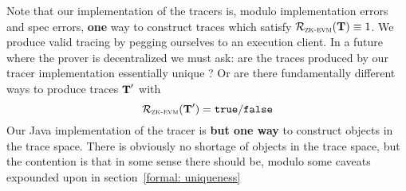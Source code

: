 Note that our implementation of the tracers is, modulo implementation errors and spec errors, \textbf{one} way to construct traces which satisfy $\mathcal{R}_{\textsc{zk-evm}}(\textbf{T}) \equiv 1$. We produce valid tracing by pegging ourselves to an \evm{} execution client. In a future where the prover is decentralized we must ask: are the traces produced by our tracer implementation essentially unique ? Or are there fundamentally different ways to produce traces $\textbf{T}'$ with 
\[
	\mathcal{R}_{\textsc{zk-evm}}(\textbf{T}') = \mathtt{true} / \mathtt{false}
\]
Our Java implementation of the tracer is \textbf{but one way} to construct objects in the trace space. There is obviously no shortage of objects in the trace space, but the contention is that in some sense there should be, modulo some caveats expounded upon in section~\ref{formal: uniqueness} 
